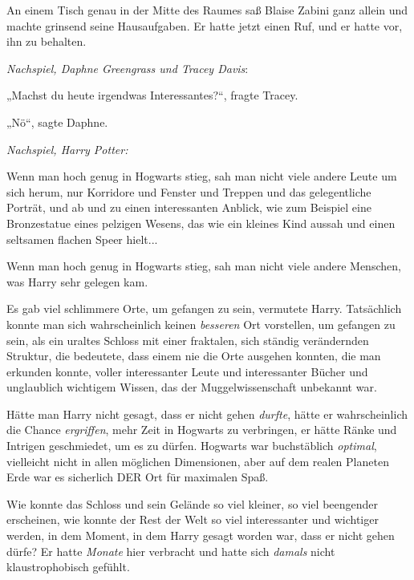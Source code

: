 {An einem Tisch genau in der Mitte des Raumes saß Blaise Zabini ganz allein und machte grinsend seine Hausaufgaben. Er hatte jetzt einen Ruf, und er hatte vor, ihn zu behalten.

\emph{Nachspiel, Daphne Greengrass und Tracey Davis}:

„Machst du heute irgendwas Interessantes?“, fragte Tracey.

„Nö“, sagte Daphne.

\emph{\emph{Nachspiel, Harry Potter:}}

Wenn man hoch genug in Hogwarts stieg, sah man nicht viele andere Leute um sich herum, nur Korridore und Fenster und Treppen und das gelegentliche Porträt, und ab und zu einen interessanten Anblick, wie zum Beispiel eine Bronzestatue eines pelzigen Wesens, das wie ein kleines Kind aussah und einen seltsamen flachen Speer hielt...

Wenn man hoch genug in Hogwarts stieg, sah man nicht viele andere Menschen, was Harry sehr gelegen kam.

Es gab viel schlimmere Orte, um gefangen zu sein, vermutete Harry. Tatsächlich konnte man sich wahrscheinlich keinen \emph{besseren} Ort vorstellen, um gefangen zu sein, als ein uraltes Schloss mit einer fraktalen, sich ständig verändernden Struktur, die bedeutete, dass einem nie die Orte ausgehen konnten, die man erkunden konnte, voller interessanter Leute und interessanter Bücher und unglaublich wichtigem Wissen, das der Muggelwissenschaft unbekannt war.

Hätte man Harry nicht gesagt, dass er nicht gehen \emph{durfte}, hätte er wahrscheinlich die Chance \emph{ergriffen}, mehr Zeit in Hogwarts zu verbringen, er hätte Ränke und Intrigen geschmiedet, um es zu dürfen. Hogwarts war buchstäblich \emph{optimal}, vielleicht nicht in allen möglichen Dimensionen, aber auf dem realen Planeten Erde war es sicherlich DER Ort für maximalen Spaß.

Wie konnte das Schloss und sein Gelände so viel kleiner, so viel beengender erscheinen, wie konnte der Rest der Welt so viel interessanter und wichtiger werden, in dem Moment, in dem Harry gesagt worden war, dass er nicht gehen dürfe? Er hatte \emph{Monate} hier verbracht und hatte sich \emph{damals} nicht klaustrophobisch gefühlt.

}
